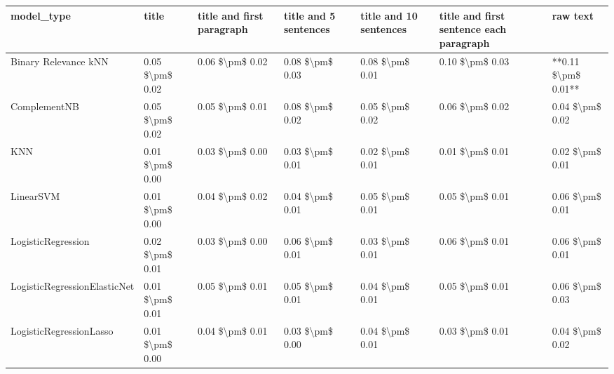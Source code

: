 \begin{tabular}{lllllll}
\toprule
                     model\_type &           title & title and first paragraph & title and 5 sentences & title and 10 sentences & title and first sentence each paragraph &            raw text \\
\midrule
           Binary Relevance kNN & 0.05 \$\textbackslash pm\$ 0.02 &           0.06 \$\textbackslash pm\$ 0.02 &       0.08 \$\textbackslash pm\$ 0.03 &        0.08 \$\textbackslash pm\$ 0.01 &                         0.10 \$\textbackslash pm\$ 0.03 & **0.11 \$\textbackslash pm\$ 0.01** \\
                   ComplementNB & 0.05 \$\textbackslash pm\$ 0.02 &           0.05 \$\textbackslash pm\$ 0.01 &       0.08 \$\textbackslash pm\$ 0.02 &        0.05 \$\textbackslash pm\$ 0.02 &                         0.06 \$\textbackslash pm\$ 0.02 &     0.04 \$\textbackslash pm\$ 0.02 \\
                            KNN & 0.01 \$\textbackslash pm\$ 0.00 &           0.03 \$\textbackslash pm\$ 0.00 &       0.03 \$\textbackslash pm\$ 0.01 &        0.02 \$\textbackslash pm\$ 0.01 &                         0.01 \$\textbackslash pm\$ 0.01 &     0.02 \$\textbackslash pm\$ 0.01 \\
                      LinearSVM & 0.01 \$\textbackslash pm\$ 0.00 &           0.04 \$\textbackslash pm\$ 0.02 &       0.04 \$\textbackslash pm\$ 0.01 &        0.05 \$\textbackslash pm\$ 0.01 &                         0.05 \$\textbackslash pm\$ 0.01 &     0.06 \$\textbackslash pm\$ 0.01 \\
             LogisticRegression & 0.02 \$\textbackslash pm\$ 0.01 &           0.03 \$\textbackslash pm\$ 0.00 &       0.06 \$\textbackslash pm\$ 0.01 &        0.03 \$\textbackslash pm\$ 0.01 &                         0.06 \$\textbackslash pm\$ 0.01 &     0.06 \$\textbackslash pm\$ 0.01 \\
   LogisticRegressionElasticNet & 0.01 \$\textbackslash pm\$ 0.01 &           0.05 \$\textbackslash pm\$ 0.01 &       0.05 \$\textbackslash pm\$ 0.01 &        0.04 \$\textbackslash pm\$ 0.01 &                         0.05 \$\textbackslash pm\$ 0.01 &     0.06 \$\textbackslash pm\$ 0.03 \\
        LogisticRegressionLasso & 0.01 \$\textbackslash pm\$ 0.00 &           0.04 \$\textbackslash pm\$ 0.01 &       0.03 \$\textbackslash pm\$ 0.00 &        0.04 \$\textbackslash pm\$ 0.01 &                         0.03 \$\textbackslash pm\$ 0.01 &     0.04 \$\textbackslash pm\$ 0.02 \\

\end{tabular}

